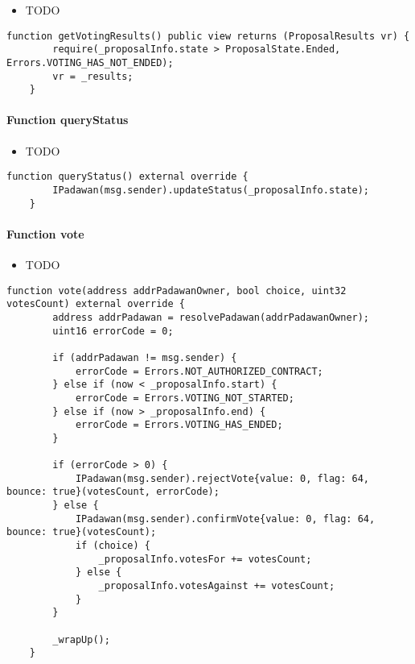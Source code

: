 \begin{itemize}
\item TODO
\end{itemize}

\begin{lstlisting}[firstnumber=172]
    function getVotingResults() public view returns (ProposalResults vr) {
        require(_proposalInfo.state > ProposalState.Ended, Errors.VOTING_HAS_NOT_ENDED);
        vr = _results;
    }
\end{lstlisting}

\paragraph{Function queryStatus}

\begin{itemize}
\item TODO
\end{itemize}

\begin{lstlisting}[firstnumber=162]
    function queryStatus() external override {
        IPadawan(msg.sender).updateStatus(_proposalInfo.state);
    }
\end{lstlisting}

\paragraph{Function vote}

\begin{itemize}
\item TODO
\end{itemize}

\begin{lstlisting}[firstnumber=55]
    function vote(address addrPadawanOwner, bool choice, uint32 votesCount) external override {
        address addrPadawan = resolvePadawan(addrPadawanOwner);
        uint16 errorCode = 0;

        if (addrPadawan != msg.sender) {
            errorCode = Errors.NOT_AUTHORIZED_CONTRACT;
        } else if (now < _proposalInfo.start) {
            errorCode = Errors.VOTING_NOT_STARTED;
        } else if (now > _proposalInfo.end) {
            errorCode = Errors.VOTING_HAS_ENDED;
        }

        if (errorCode > 0) {
            IPadawan(msg.sender).rejectVote{value: 0, flag: 64, bounce: true}(votesCount, errorCode);
        } else {
            IPadawan(msg.sender).confirmVote{value: 0, flag: 64, bounce: true}(votesCount);
            if (choice) {
                _proposalInfo.votesFor += votesCount;
            } else {
                _proposalInfo.votesAgainst += votesCount;
            }
        }

        _wrapUp();
    }
\end{lstlisting}

